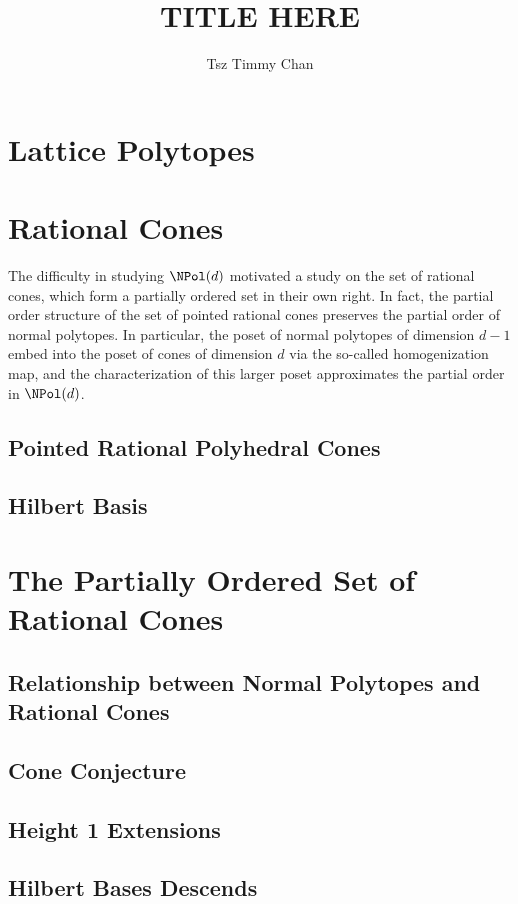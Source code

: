 \documentclass{TC}
\title{TITLE HERE}	%
\author{Tsz Timmy Chan}	%
\begin{document}
\section{Lattice Polytopes}



\section{Rational Cones}

The difficulty in studying $\NPol(d)$ motivated a study on the set of rational cones, which form a partially ordered set in their own right. In fact, the partial order structure of the set of pointed rational cones preserves the partial order of normal polytopes. In particular, the poset of normal polytopes of dimension $d-1$ embed into the poset of cones of dimension $d$ via the so-called homogenization map, and the characterization of this larger poset approximates the partial order in $\NPol(d)$.

\subsection{Pointed Rational Polyhedral Cones}



\subsection{Hilbert Basis}




\section{The Partially Ordered Set of Rational  Cones}


\subsection{Relationship between Normal Polytopes and Rational Cones}



\subsection{Cone Conjecture}


\subsection{Height 1 Extensions}

\subsection{Hilbert Bases Descends}

\end{document}
